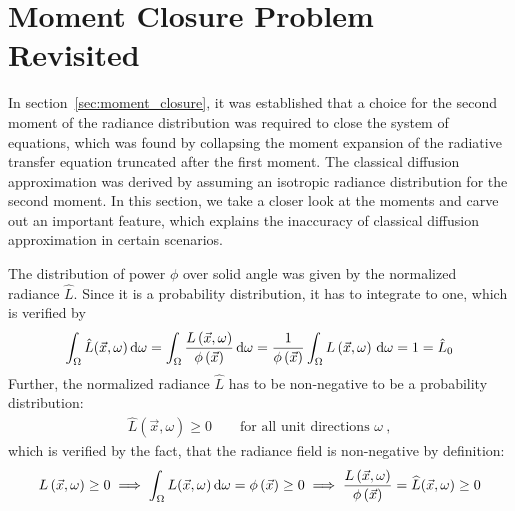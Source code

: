 \section{Moment Closure Problem Revisited}
\label{sec:moment_problem_revisited}

In section~\ref{sec:moment_closure}, it was established that a choice for the second moment of the radiance distribution was required to close the system of equations, which was found by collapsing the moment expansion of the radiative transfer equation truncated after the first moment. The classical diffusion approximation was derived by assuming an isotropic radiance distribution for the second moment. In this section, we take a closer look at the moments and carve out an important feature, which explains the inaccuracy of classical diffusion approximation in certain scenarios.

The distribution of power $\phi$ over solid angle was given by the normalized radiance $\widehat{L}$. Since it is a probability distribution, it has to integrate to one, which is verified by
\begin{align*}
\int_{\Omega}{\hat{L}(\vec{x}, \omega)\,\mathrm{d}\omega}=
\int_{\Omega}{\frac{L\left(\vec{x}, \omega\right)}{\phi\left(\vec{x}\right)}\,\mathrm{d}\omega}=
\frac{1}{\phi\left(\vec{x}\right)}
\int_{\Omega}{L\left(\vec{x}, \omega\right)\,\mathrm{d}\omega}
=1
=\hat{L}_0
\end{align*}
Further, the normalized radiance $\widehat{L}$ has to be non-negative to be a probability distribution:
\begin{align*}
\hat{L}(\vec{x}, \omega)\ge 0 \qquad \text{for all unit directions } \omega
\ ,
\end{align*}
which is verified by the fact, that the radiance field is non-negative by definition:
\begin{align*}
L\left(\vec{x}, \omega\right) \ge 0
\implies
\int_{\Omega}{L(\vec{x}, \omega)\,\mathrm{d}\omega}=\phi\left(\vec{x}\right)\ge 0
\implies
\frac{L\left(\vec{x}, \omega\right)}{\phi\left(\vec{x}\right)}=\widehat{L}(\vec{x}, \omega) \ge 0
\end{align*}

